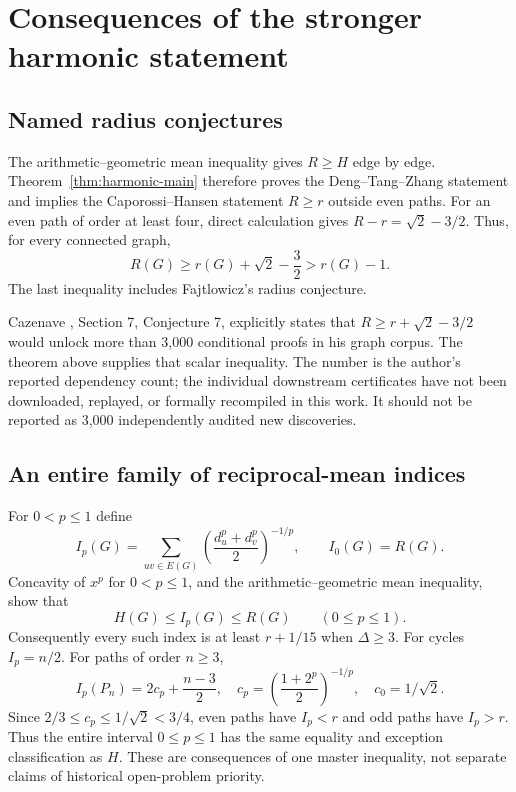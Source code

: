 \documentclass[11pt,a4paper]{article}
\begin{document}
\section{Consequences of the stronger harmonic statement}\label{sec:cascade}
\subsection{Named radius conjectures}
The arithmetic--geometric mean inequality gives $R\ge H$ edge by
edge. Theorem~\ref{thm:harmonic-main} therefore proves the
Deng--Tang--Zhang statement and implies the Caporossi--Hansen
statement $R\ge r$ outside even paths. For an even path of order
at least four, direct calculation gives
$R-r=\sqrt2-3/2$. Thus, for every connected graph,
\[
R(G)\ge r(G)+\sqrt2-\frac32>r(G)-1.
\]
The last inequality includes Fajtlowicz's radius conjecture.

Cazenave \cite{Cazenave}, Section 7, Conjecture 7, explicitly states
that $R\ge r+\sqrt2-3/2$ would unlock more than 3,000 conditional
proofs in his graph corpus. The theorem above supplies that scalar
inequality. The number is the author's reported dependency count;
the individual downstream certificates have not been downloaded,
replayed, or formally recompiled in this work. It should not be
reported as 3,000 independently audited new discoveries.

\subsection{An entire family of reciprocal-mean indices}
For $0<p\le1$ define
\[
I_p(G)=\sum_{uv\in E(G)}
 \left(\frac{d_u^p+d_v^p}{2}\right)^{-1/p},
\qquad I_0(G)=R(G).
\]
Concavity of $x^p$ for $0<p\le1$, and the arithmetic--geometric
mean inequality, show that
\[
H(G)\le I_p(G)\le R(G)\qquad(0\le p\le1).
\]
Consequently every such index is at least $r+1/15$ when
$\Delta\ge3$. For cycles $I_p=n/2$. For paths of order $n\ge3$,
\[
I_p(P_n)=2c_p+\frac{n-3}{2},\quad
c_p=\left(\frac{1+2^p}{2}\right)^{-1/p},\quad c_0=1/\sqrt2.
\]
Since $2/3\le c_p\le1/\sqrt2<3/4$, even paths have $I_p<r$
and odd paths have $I_p>r$. Thus the entire interval $0\le p\le1$
has the same equality and exception classification as $H$.
These are consequences of one master inequality, not separate
claims of historical open-problem priority.
\end{document}
